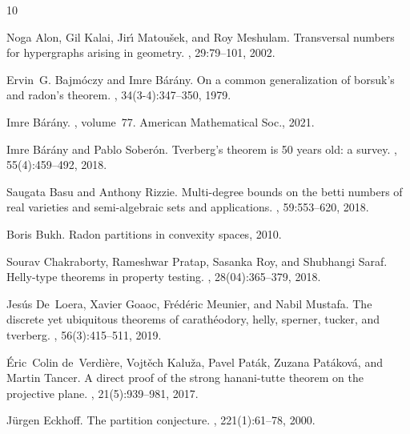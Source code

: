 \documentclass[11pt]{article}
\begin{document}
\begin{thebibliography}{10}

Noga Alon, Gil Kalai, Jir{\'\i} Matou\v{s}ek, and Roy Meshulam.
\newblock Transversal numbers for hypergraphs arising in geometry.
, 29:79--101, 2002.

Ervin~G. Bajm{\'o}czy and Imre B{\'a}r{\'a}ny.
\newblock On a common generalization of borsuk's and radon's theorem.
, 34(3-4):347--350, 1979.

Imre B{\'a}r{\'a}ny.
, volume~77.
\newblock American Mathematical Soc., 2021.

Imre B{\'a}r{\'a}ny and Pablo Sober{\'o}n.
\newblock Tverberg’s theorem is 50 years old: a survey.
, 55(4):459--492,
  2018.

Saugata Basu and Anthony Rizzie.
\newblock Multi-degree bounds on the betti numbers of real varieties and
  semi-algebraic sets and applications.
, 59:553--620, 2018.

Boris Bukh.
\newblock Radon partitions in convexity spaces, 2010.

Sourav Chakraborty, Rameshwar Pratap, Sasanka Roy, and Shubhangi Saraf.
\newblock Helly-type theorems in property testing.
, 28(04):365--379, 2018.

Jes{\'u}s De~Loera, Xavier Goaoc, Fr{\'e}d{\'e}ric Meunier, and Nabil Mustafa.
\newblock The discrete yet ubiquitous theorems of carath{\'e}odory, helly,
  sperner, tucker, and tverberg.
, 56(3):415--511,
  2019.

{\'E}ric~Colin de~Verdi{\`e}re, Vojt{\v{e}}ch Kalu{\v{z}}a, Pavel Pat{\'a}k,
  Zuzana Pat{\'a}kov{\'a}, and Martin Tancer.
\newblock A direct proof of the strong hanani-tutte theorem on the projective
  plane.
, 21(5):939--981,
  2017.

Jürgen Eckhoff.
\newblock The partition conjecture.
, 221(1):61--78, 2000.


\end{thebibliography}
\end{document}
